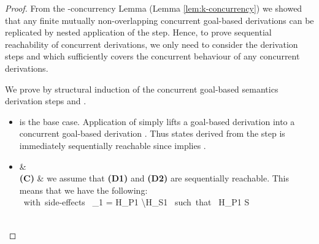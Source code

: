 \documentclass{tlp}
\begin{document}
\begin{proof}
From the -concurrency Lemma (Lemma \ref{lem:k-concurrency}) we showed that any finite 
 mutually non-overlapping concurrent goal-based derivations can be replicated by nested 
application of the  step. Hence, to prove sequential reachability of 
concurrent derivations, we only need to consider the derivation steps  and 
 which sufficiently covers the concurrent behaviour of any  
concurrent derivations. 

We prove by structural induction of the concurrent goal-based semantics derivation steps 
 and .
  \begin{itemize}
	  \item {} is the base case. Application of  simply lifts a
	        goal-based derivation  into a concurrent
	        goal-based derivation . Thus states 
	         derived from the  step is immediately sequentially
	        reachable since  implies
	        .
	  \item {}
	        {\small 
              {
                 &  \\
               \mbox{\bf (C)} \sgap \partranssf{\delta} 
                 & 
               \ea} 
	        \eda }
	        we assume that {\bf (D1)} and {\bf (D2)} are sequentially reachable. This means that 
	        we have the following:
	           \goaltransstar {} \\
	          \mbox{ with side-effects } \delta_1 = H_{P1} \backslash H_{S1} \mbox{ such that } H_{P1} \subseteq S   \\ \\

\end{itemize}
\end{proof}
\end{document}
